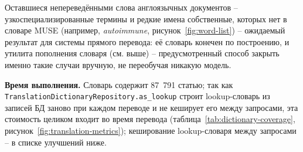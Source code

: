 Оставшиеся непереведёнными слова англоязычных документов --
узкоспециализированные термины и редкие имена собственные, которых
нет в словаре MUSE (например, \emph{autoimmune}, рисунок~\ref{fig:word-list})
-- ожидаемый результат для системы прямого перевода: её словарь
конечен по построению, и утилита пополнения словаря (см. выше) --
предусмотренный способ закрыть именно такие случаи вручную, не
переобучая никакую модель.

\textbf{Время выполнения.} Словарь содержит 87~791 статью; так как
\texttt{TranslationDictionaryRepository.as\_lookup} строит
lookup-словарь из записей БД заново при каждом переводе и не кеширует
его между запросами, эта стоимость целиком входит во время перевода
(таблица~\ref{tab:dictionary-coverage}, рисунок~\ref{fig:translation-metrics});
кеширование lookup-словаря между запросами -- в списке улучшений ниже.


